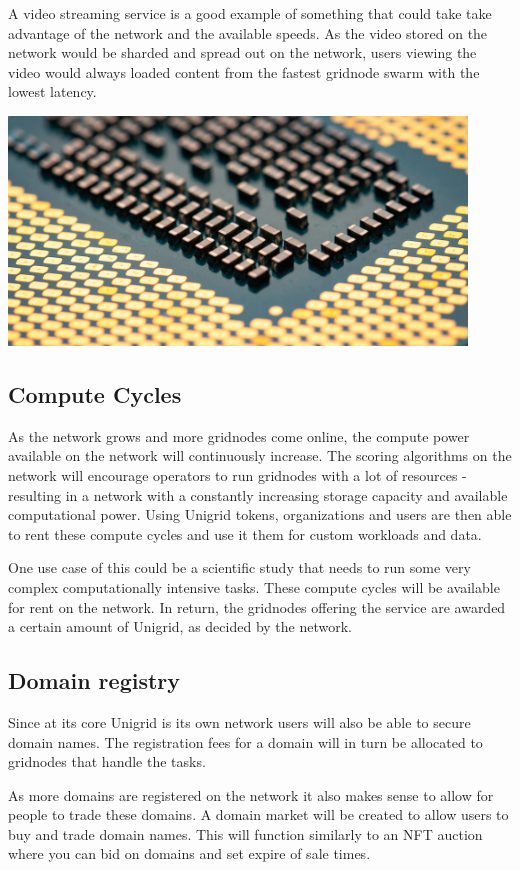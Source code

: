 \documentclass{article}
\begin{document}
A video streaming service is a good example of something that could take take advantage of the network and the available speeds. As the video stored on the network would be sharded and spread out on the network, users viewing the video would always loaded content from the fastest gridnode swarm with the lowest latency.
\begin{mdframed}[style=textimage]
	\includegraphics[width=345pt]{compute}
\end{mdframed}

\subsection{Compute Cycles}
As the network grows and more gridnodes come online, the compute power available on the network will continuously increase. The scoring algorithms on the network will encourage operators to run gridnodes with a lot of resources - resulting in a network with a constantly increasing storage capacity and available computational power. Using Unigrid tokens, organizations and users are then able to rent these compute cycles and use it them for custom workloads and data.

One use case of this could be a scientific study that needs to run some very complex computationally intensive tasks. These compute cycles will be available for rent on the network. In return, the gridnodes offering the service are awarded a certain amount of Unigrid, as decided by the network.

\subsection{Domain registry}
Since at its core Unigrid is its own network users will also be able to secure domain names. The registration fees for a domain will in turn be allocated to gridnodes that handle the tasks.

As more domains are registered on the network it also makes sense to allow for people to trade these domains. A domain market will be created to allow users to buy and trade domain names. This will function similarly to an NFT auction where you can bid on domains and set expire of sale times.
\end{document}
